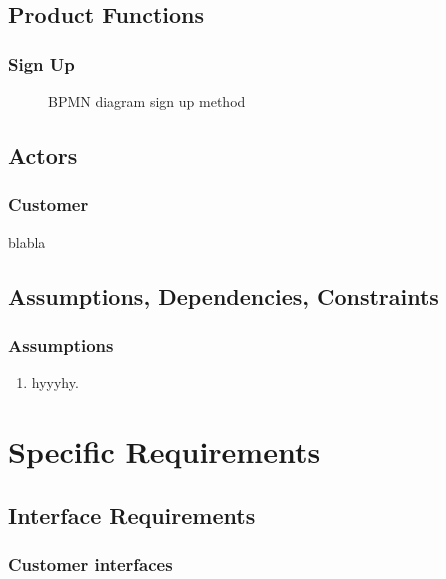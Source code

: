 \subsection{Product Functions}
\label{product_functions}

\subsubsection{Sign Up}
\label{sign_up}

\begin{figure}[H]
    \begin{center}
        \caption{BPMN diagram sign up method}
    \end{center}
\end{figure}


\subsection{Actors}
\subsubsection{Customer}
blabla

\subsection{Assumptions, Dependencies, Constraints}
\subsubsection{Assumptions}
\begin{enumerate}[label=\textbf{D\arabic*}:]
    \item hyyyhy.

\end{enumerate}

\newpage
\section{Specific Requirements}
\subsection{Interface Requirements}
\subsubsection{Customer interfaces}


